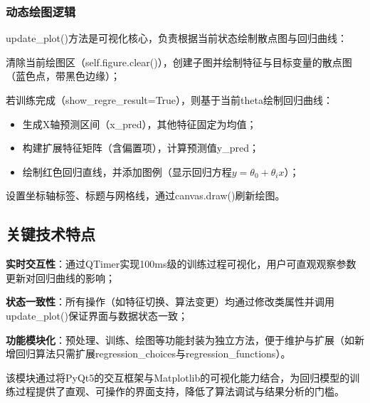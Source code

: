 \subsubsection{动态绘图逻辑}
update\_plot()方法是可视化核心，负责根据当前状态绘制散点图与回归曲线：
\par 清除当前绘图区（self.figure.clear()），创建子图并绘制特征与目标变量的散点图（蓝色点，带黑色边缘）；
\par 若训练完成（show\_regre\_result=True），则基于当前theta绘制回归曲线：
\begin{itemize}
   \item 生成X轴预测区间（x\_pred），其他特征固定为均值；
   \item 构建扩展特征矩阵（含偏置项），计算预测值y\_pred；
   \item 绘制红色回归直线，并添加图例（显示回归方程$y = \theta_0 + \theta_i x$）；
\end{itemize}
\par  设置坐标轴标签、标题与网格线，通过canvas.draw()刷新绘图。

\subsection{关键技术特点}
\par  \textbf{实时交互性}：通过QTimer实现100ms级的训练过程可视化，用户可直观观察参数更新对回归曲线的影响；
\par  \textbf{状态一致性}：所有操作（如特征切换、算法变更）均通过修改类属性并调用update\_plot()保证界面与数据状态一致；
\par  \textbf{功能模块化}：预处理、训练、绘图等功能封装为独立方法，便于维护与扩展（如新增回归算法只需扩展regression\_choices与regression\_functions）。

该模块通过将PyQt5的交互框架与Matplotlib的可视化能力结合，为回归模型的训练过程提供了直观、可操作的界面支持，降低了算法调试与结果分析的门槛。